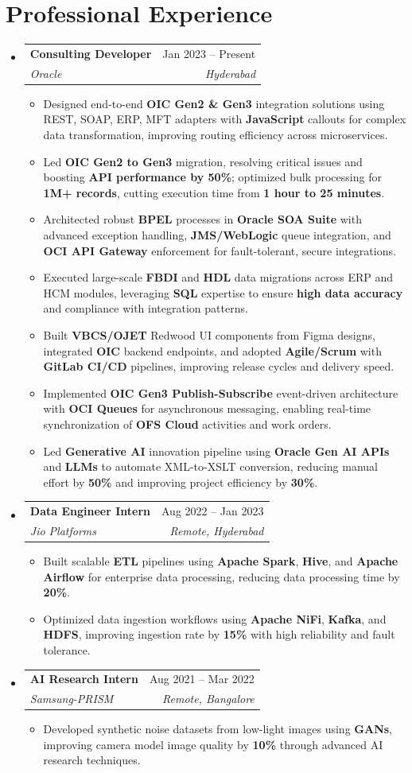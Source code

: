 \documentclass[letterpaper,11pt]{article}
\makeatletter
\newcommand{\resumeItem}[1]{
  \item\small{
    {#1 \vspace{-2pt}}
  }
}
\newcommand{\resumeSubheading}[4]{
  \vspace{-2pt}\item
    \begin{tabular*}{0.97\textwidth}[t]{l@{\extracolsep{\fill}}r}
      \textbf{#1} & #2 \\
      \textit{\small#3} & \textit{\small #4} \\
    \end{tabular*}\vspace{-7pt}
}
\newcommand{\resumeSubHeadingListStart}{\begin{itemize}[leftmargin=0.15in, label={}]}
\newcommand{\resumeSubHeadingListEnd}{\end{itemize}}
\newcommand{\resumeItemListStart}{\begin{itemize}}
\newcommand{\resumeItemListEnd}{\end{itemize}\vspace{-5pt}}
\makeatother
\begin{document}
\section{Professional Experience}
\resumeSubHeadingListStart
    \resumeSubheading
      {Consulting Developer}{Jan 2023 -- Present}
      {Oracle}{Hyderabad}
      \resumeItemListStart
        \resumeItem{Designed end-to-end \textbf{OIC Gen2 \& Gen3} integration solutions using REST, SOAP, ERP, MFT adapters with \textbf{JavaScript} callouts for complex data transformation, improving routing efficiency across microservices.}
        \resumeItem{Led \textbf{OIC Gen2 to Gen3} migration, resolving critical issues and boosting \textbf{API performance by 50\%}; optimized bulk processing for \textbf{1M+ records}, cutting execution time from \textbf{1 hour to 25 minutes}.}
        \resumeItem{Architected robust \textbf{BPEL} processes in \textbf{Oracle SOA Suite} with advanced exception handling, \textbf{JMS/WebLogic} queue integration, and \textbf{OCI API Gateway} enforcement for fault-tolerant, secure integrations.}
        \resumeItem{Executed large-scale \textbf{FBDI} and \textbf{HDL} data migrations across ERP and HCM modules, leveraging \textbf{SQL} expertise to ensure \textbf{high data accuracy} and compliance with integration patterns.}
        \resumeItem{Built \textbf{VBCS/OJET} Redwood UI components from Figma designs, integrated \textbf{OIC} backend endpoints, and adopted \textbf{Agile/Scrum} with \textbf{GitLab CI/CD} pipelines, improving release cycles and delivery speed.}
        \resumeItem{Implemented \textbf{OIC Gen3 Publish-Subscribe} event-driven architecture with \textbf{OCI Queues} for asynchronous messaging, enabling real-time synchronization of \textbf{OFS Cloud} activities and work orders.}
        \resumeItem{Led \textbf{Generative AI} innovation pipeline using \textbf{Oracle Gen AI APIs} and \textbf{LLMs} to automate XML-to-XSLT conversion, reducing manual effort by \textbf{50\%} and improving project efficiency by \textbf{30\%}.}
      \resumeItemListEnd
    \resumeSubheading
      {Data Engineer Intern}{Aug 2022 -- Jan 2023}
      {Jio Platforms}{Remote, Hyderabad}
      \resumeItemListStart
        \resumeItem{Built scalable \textbf{ETL} pipelines using \textbf{Apache Spark}, \textbf{Hive}, and \textbf{Apache Airflow} for enterprise data processing, reducing data processing time by \textbf{20\%}.}
        \resumeItem{Optimized data ingestion workflows using \textbf{Apache NiFi}, \textbf{Kafka}, and \textbf{HDFS}, improving ingestion rate by \textbf{15\%} with high reliability and fault tolerance.}
      \resumeItemListEnd
    \resumeSubheading
      {AI Research Intern}{Aug 2021 -- Mar 2022}
      {Samsung-PRISM}{Remote, Bangalore}
      \resumeItemListStart
        \resumeItem{Developed synthetic noise datasets from low-light images using \textbf{GANs}, improving camera model image quality by \textbf{10\%} through advanced AI research techniques.}
      \resumeItemListEnd
\resumeSubHeadingListEnd
\end{document}
